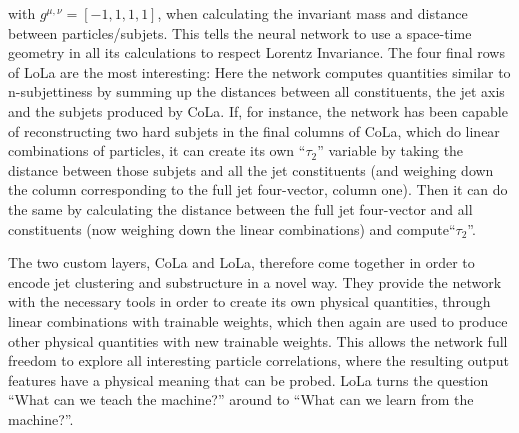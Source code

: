 with $g^{\mu,\nu}=[-1,1,1,1]$, when calculating the invariant mass and distance between particles/subjets. This tells the neural network to use a space-time geometry in all its calculations to respect Lorentz Invariance. The four final rows of LoLa are the most interesting: Here the network computes quantities similar to n-subjettiness by summing up the distances between all constituents, the jet axis and the subjets produced by CoLa. If, for instance, the network has been capable of reconstructing two hard subjets in the final columns of CoLa, which do linear combinations of particles, it can create its own ``$\tau_2$'' variable by taking the distance between those subjets and all the jet constituents (and weighing down the column corresponding to the full jet four-vector, column one). Then it can do the same by calculating the distance between the full jet four-vector and all constituents (now weighing down the linear combinations) and compute``$\tau_2$''.\par

The two custom layers, CoLa and LoLa, therefore come together in order to encode jet clustering and substructure in a novel way. They provide the network with the necessary tools in order to create its own physical quantities, through linear combinations with trainable weights, which then again are used to produce other physical quantities with new trainable weights. This allows the network full freedom to explore all interesting particle correlations, where the resulting output features have a physical meaning that can be probed.\newline
LoLa turns the question ``What can we teach the machine?'' around to ``What can we learn from the machine?''. 

